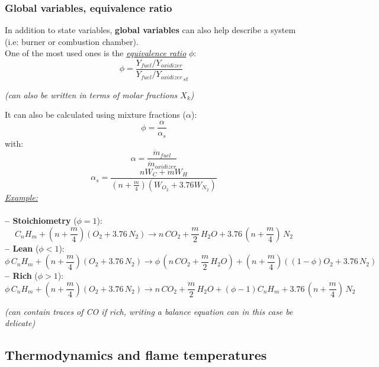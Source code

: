 \documentclass[a4paper,11pt]{article}
\begin{document}
\subsubsection{Global variables, equivalence ratio}
In addition to state variables, \textbf{global variables} can also help describe a system (i.e: burner or combustion chamber). \\
One of the most used ones is the \underline{\emph{equivalence ratio}} $\phi$:
\[ \phi = \frac{Y_{fuel}/Y_{oxidizer}}{Y_{fuel}/Y_{oxidizer}}_{st}\]
\begin{center}
    \textit{(can also be written in terms of molar fractions $X_k$)}
\end{center}
It can also be calculated using mixture fractions ($\alpha$):
\[\phi = \frac{\alpha}{\alpha_s}\]
with:
\[\alpha = \frac{\dot{m}_{fuel}}{\dot{m}_{oxidizer}}\]
\[\alpha_s = \frac{nW_C+mW_H}{(n+\frac{m}{4})(W_{O_2}+3.76W_{N_2})}\]
\underline{\emph{Example:}}\\ \\
\textbf{-- Stoichiometry} ($\phi = 1$):
\[C_nH_m + (n+ \frac{m}{4})(O_2+3.76\,N_2) \rightarrow n\,CO_2 + \frac{m}{2}\,H_2O+3.76\,(n+\frac{m}{4})\,N_2\]
\textbf{-- Lean} ($\phi < 1$):
\[\phi\,C_nH_m + (n+ \frac{m}{4})(O_2+3.76\,N_2) \rightarrow \phi\, (n\,CO_2 + \frac{m}{2}\,H_2O)+(n+\frac{m}{4})((1-\phi)O_2+3.76\,N_2)\]
\textbf{-- Rich} ($\phi > 1$):
\[\phi\,C_nH_m + (n+ \frac{m}{4})(O_2+3.76\,N_2) \rightarrow n\,CO_2 + \frac{m}{2}\,H_2O+(\phi-1)C_nH_m+3.76\,(n+\frac{m}{4})\,N_2\]
\begin{center}
\emph{(can contain traces of CO if rich, writing a balance equation can in this case be delicate)}
\end{center}
\pagebreak
\subsection{Thermodynamics and flame temperatures}
\end{document}

